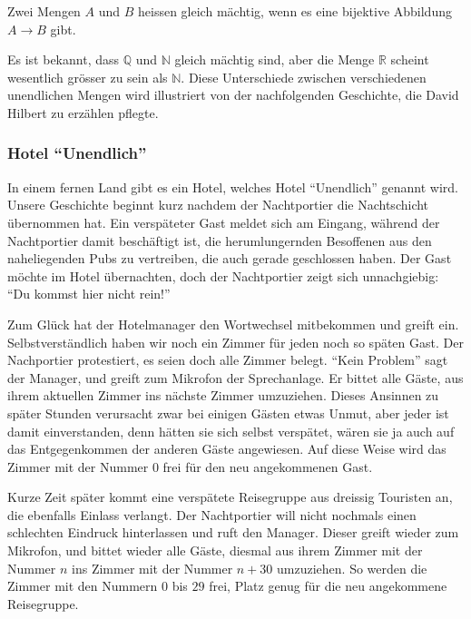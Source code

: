 \begin{definition}
Zwei Mengen $A$ und $B$ heissen gleich mächtig, wenn es eine bijektive
Abbildung $A\to B$ gibt.
\end{definition}

Es ist bekannt, dass $\mathbb Q$ und $\mathbb N$ gleich mächtig sind,
aber die Menge $\mathbb R$ scheint wesentlich grösser
zu sein als $\mathbb N$.
Diese Unterschiede zwischen verschiedenen
unendlichen Mengen wird illustriert von der nachfolgenden Geschichte,
die David Hilbert zu erzählen pflegte.

\subsubsection{Hotel ``Unendlich''}
In einem fernen Land gibt es ein Hotel, welches Hotel ``Unendlich''
genannt wird. Unsere Geschichte beginnt kurz nachdem der Nachtportier
die Nachtschicht übernommen hat. Ein verspäteter Gast meldet sich
am Eingang, während der Nachtportier damit beschäftigt ist,
die herumlungernden Besoffenen
aus den naheliegenden Pubs zu vertreiben, die auch gerade geschlossen haben.
Der Gast möchte im Hotel übernachten, doch der Nachtportier zeigt sich
unnachgiebig: ``Du kommst hier nicht rein!''

Zum Glück hat der Hotelmanager den Wortwechsel mitbekommen und greift
ein. Selbstverständlich haben wir noch ein Zimmer für jeden noch so
späten Gast. Der Nachportier protestiert, es seien doch alle Zimmer
belegt. ``Kein Problem'' sagt der Manager, und greift zum Mikrofon
der Sprechanlage. Er bittet alle Gäste, aus ihrem aktuellen Zimmer
ins nächste Zimmer umzuziehen. Dieses Ansinnen zu später Stunden
verursacht zwar bei einigen Gästen etwas Unmut, aber jeder ist damit
einverstanden, denn hätten sie sich selbst verspätet, wären sie ja
auch auf das Entgegenkommen der anderen Gäste angewiesen. Auf diese
Weise wird das Zimmer mit der Nummer $0$ frei für den neu angekommenen
Gast.

Kurze Zeit später kommt eine verspätete Reisegruppe aus dreissig
Touristen an, die ebenfalls
Einlass verlangt. Der Nachtportier will nicht nochmals einen schlechten
Eindruck hinterlassen und ruft den Manager. Dieser greift
wieder zum Mikrofon, und bittet wieder alle Gäste, diesmal aus
ihrem Zimmer mit der Nummer $n$ ins Zimmer mit der Nummer $n+30$
umzuziehen. So werden die Zimmer mit den Nummern $0$ bis $29$ frei,
Platz genug für die neu angekommene Reisegruppe.


